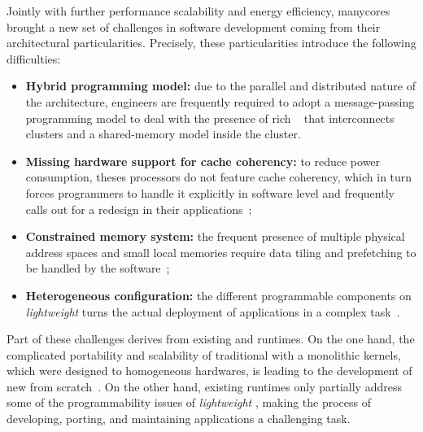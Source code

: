 	Jointly with further performance scalability and energy efficiency, manycores brought a new
	set of challenges in software development coming from their architectural particularities.
	Precisely, these particularities introduce the following difficulties:
	\begin{itemize}
		\item \textbf{Hybrid programming model:} due to the parallel and distributed nature of
			the architecture, engineers are frequently required to adopt a message-passing
			programming model to deal with the presence of rich \nocs~\cite{kelly2013} that
			interconnects clusters and a shared-memory model inside the cluster.
		\item \textbf{Missing hardware support for cache coherency:} to reduce power consumption,
			theses processors do not feature cache coherency, which in turn forces programmers to
			handle it explicitly in software level and frequently calls out for a redesign in their
			applications~\cite{francesquini2015};
		\item \textbf{Constrained memory system:} the frequent presence of multiple physical
			address spaces and small local memories require data tiling and prefetching to be
			handled by the software~\cite{Castro2016};
		\item \textbf{Heterogeneous configuration:} the different programmable components on
			\textit{lightweight} \manycores turns the actual deployment of applications in a
			complex task~\cite{barbalace2015}.
	\end{itemize}

	Part of these challenges derives from existing \oses and runtimes.
	On the one hand, the complicated portability and scalability of traditional \oses with a
	monolithic kernels, which were designed to homogeneous hardwares, is leading to the development
	of new \oses from scratch~\cite{Baumann2009, kluge2014, nightingale2009, rhoden2011}.
	On the other hand, existing runtimes only partially address some of the programmability issues
	of \textit{lightweight} \manycores, making the process of developing, porting, and maintaining
	applications a challenging task.



